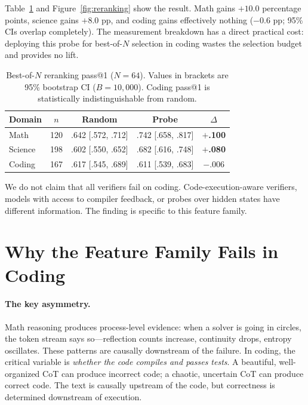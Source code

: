\documentclass[10pt,twocolumn]{article}
\begin{document}
Table~\ref{tab:reranking} and Figure~\ref{fig:reranking} show the result. Math gains $+10.0$ percentage points, science gains $+8.0$ pp, and coding gains effectively nothing ($-0.6$ pp; 95\% CIs overlap completely). The measurement breakdown has a direct practical cost: deploying this probe for best-of-$N$ selection in coding wastes the selection budget and provides no lift.

\begin{table}[h]
\centering
\small
\begin{tabular}{lcccc}
\toprule
Domain & $n$ & Random & Probe & $\Delta$ \\
\midrule
Math    & 120 & .642 [.572, .712] & .742 [.658, .817] & \textbf{$+$.100} \\
Science & 198 & .602 [.550, .652] & .682 [.616, .748] & \textbf{$+$.080} \\
Coding  & 167 & .617 [.545, .689] & .611 [.539, .683] & $-$.006 \\
\bottomrule
\end{tabular}
\caption{Best-of-$N$ reranking pass@1 ($N=64$). Values in brackets are 95\% bootstrap CI ($B=10{,}000$). Coding pass@1 is statistically indistinguishable from random.}
\label{tab:reranking}
\end{table}

We do not claim that all verifiers fail on coding. Code-execution-aware verifiers, models with access to compiler feedback, or probes over hidden states have different information. The finding is specific to this feature family.

\section{Why the Feature Family Fails in Coding}
\label{sec:why}

\paragraph{The key asymmetry.} Math reasoning produces process-level evidence: when a solver is going in circles, the token stream says so---reflection counts increase, continuity drops, entropy oscillates. These patterns are causally downstream of the failure. In coding, the critical variable is \emph{whether the code compiles and passes tests}. A beautiful, well-organized CoT can produce incorrect code; a chaotic, uncertain CoT can produce correct code. The text is causally upstream of the code, but correctness is determined downstream of execution.
\end{document}
